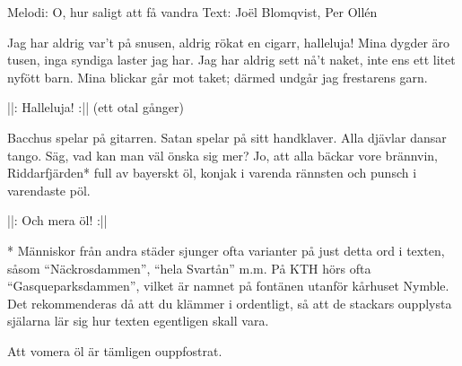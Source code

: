 \begin{song}

\begin{songmeta}
Melodi: O, hur saligt att få vandra
Text: Joël Blomqvist, Per Ollén
\end{songmeta}

\begin{songtext}
Jag har aldrig var't på snusen,
aldrig rökat en cigarr, halleluja!
Mina dygder äro tusen,
inga syndiga laster jag har.
Jag har aldrig sett nå't naket,
inte ens ett litet nyfött barn.
Mina blickar går mot taket;
därmed undgår jag frestarens garn.

||: Halleluja! :|| (ett otal gånger)

Bacchus spelar på gitarren.
Satan spelar på sitt handklaver.
Alla djävlar dansar tango.
Säg, vad kan man väl önska sig mer?
Jo, att alla bäckar vore brännvin,
Riddarfjärden* full av bayerskt öl,
konjak i varenda rännsten
och punsch i varendaste pöl.

||: Och mera öl! :||
\newpage
\end{songtext}

\begin{songnotes}
* Människor från andra städer sjunger ofta varianter på just detta ord i texten,
såsom \textquotedblleft{}Näckrosdammen\textquotedblright{}, \textquotedblleft{}hela Svartån\textquotedblright{} m.m. På KTH hörs ofta \\
\textquotedblleft{}Gasqueparksdammen\textquotedblright{}, vilket är namnet på fontänen utanför kårhuset Nymble.
Det rekommenderas då att du klämmer i ordentligt, så att de stackars oupplysta \\
själarna lär sig hur texten egentligen skall vara.

Att vomera öl är tämligen ouppfostrat.
\end{songnotes}

\end{song}
